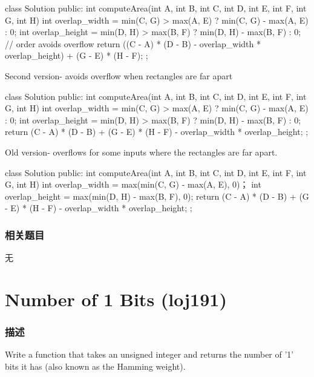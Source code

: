 \begin{Code}
class Solution {
    public:
    int computeArea(int A, int B, int C, int D, int E, int F, int G, int H) {
        int overlap_width = min(C, G) > max(A, E) ? min(C, G) - max(A, E) : 0; 
        int overlap_height = min(D, H) > max(B, F) ? min(D, H) - max(B, F) : 0;
        // order avoids overflow
        return ((C - A) * (D - B) - overlap_width * overlap_height) + (G - E) * (H - F); 
    }
};
\end{Code}

Second version- avoids overflow when rectangles are far apart

\begin{Code}
class Solution {
    public:
    int computeArea(int A, int B, int C, int D, int E, int F, int G, int H) {
        int overlap_width = min(C, G) > max(A, E) ? min(C, G) - max(A, E) : 0; 
        int overlap_height = min(D, H) > max(B, F) ? min(D, H) - max(B, F) : 0;
        return (C - A) * (D - B) + (G - E) * (H - F) - overlap_width * overlap_height;
    }
};
\end{Code}

Old version- overflows for some inputs where the rectangles are far apart.

\begin{Code}
class Solution {
    public:
    int computeArea(int A, int B, int C, int D, int E, int F, int G, int H) {
        int overlap_width = max(min(C, G) - max(A, E), 0)；
        int overlap_height = max(min(D, H) - max(B, F), 0);
        return (C - A) * (D - B) + (G - E) * (H - F) - overlap_width * overlap_height;
    }
};
\end{Code}

\subsubsection{相关题目}
\begindot
\item 无
\myenddot

\section{Number of 1 Bits (loj191)} %
\label{sec:number-of-1-bits}

\subsubsection{描述}

Write a function that takes an unsigned integer and returns the number of ’1' bits it has (also known as the Hamming weight).

